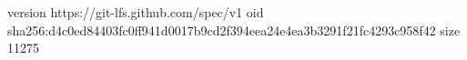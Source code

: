 version https://git-lfs.github.com/spec/v1
oid sha256:d4c0ed84403fc0ff941d0017b9cd2f394eea24e4ea3b3291f21fc4293c958f42
size 11275
